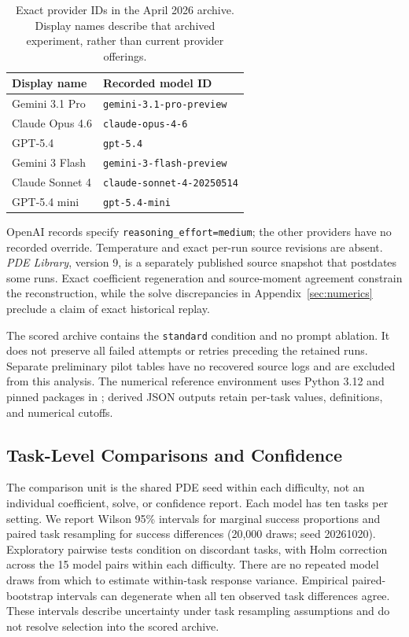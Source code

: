 \documentclass{article}
\begin{document}
\begin{table}[ht]
\centering
\caption{Exact provider IDs in the April 2026 archive. Display names describe
that archived experiment, rather than current provider offerings.}
\label{tab:models}
\begin{tabular}{@{}ll@{}}
\toprule
Display name & Recorded model ID\\
\midrule
Gemini 3.1 Pro & \texttt{gemini-3.1-pro-preview}\\
Claude Opus 4.6 & \texttt{claude-opus-4-6}\\
GPT-5.4 & \texttt{gpt-5.4}\\
Gemini 3 Flash & \texttt{gemini-3-flash-preview}\\
Claude Sonnet 4 & \texttt{claude-sonnet-4-20250514}\\
GPT-5.4 mini & \texttt{gpt-5.4-mini}\\
\bottomrule
\end{tabular}
\end{table}

OpenAI records specify \texttt{reasoning\_effort=medium}; the other providers
have no recorded override. Temperature and exact per-run source revisions are
absent. \emph{PDE Library}, version 9, is a separately published source snapshot
that postdates some runs. Exact coefficient regeneration and source-moment
agreement constrain the reconstruction, while the solve discrepancies in
Appendix~\ref{sec:numerics} preclude a claim of exact historical replay.

The scored archive contains the \texttt{standard} condition and no prompt
ablation. It does not preserve all failed attempts or retries preceding the
retained runs. Separate preliminary pilot tables have no recovered source logs
and are excluded from this analysis. The numerical reference environment uses
Python 3.12 and pinned packages in ; derived JSON outputs
retain per-task values, definitions, and numerical cutoffs.

\subsection{Task-Level Comparisons and Confidence}

The comparison unit is the shared PDE seed within each difficulty, not an
individual coefficient, solve, or confidence report. Each model has ten tasks
per setting. We report Wilson 95\% intervals for marginal success proportions
and paired task resampling for success differences (20,000 draws; seed 20261020). Exploratory pairwise tests
condition on discordant tasks, with Holm correction across the 15 model pairs
within each difficulty. There are no repeated model draws from which to estimate
within-task response variance. Empirical paired-bootstrap intervals can
degenerate when all ten observed task differences agree. These intervals describe uncertainty under task
resampling assumptions and do not resolve selection into the scored archive.
\end{document}
